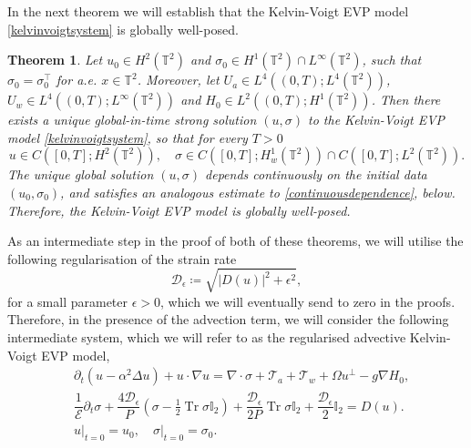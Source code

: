 \documentclass[12pt,a4paper]{article}
\newtheorem{theorem}{Theorem}[section]
\theoremstyle{definition}
\theoremstyle{remark}
\numberwithin{equation}{section}
\DeclareMathOperator{\Tr}{Tr}
\begin{document}
In the next theorem we will establish that the Kelvin-Voigt EVP model \eqref{kelvinvoigtsystem} is globally well-posed.
\begin{theorem} \label{globalwellposednessthm}
Let $u_0 \in H^2 (\mathbb{T}^2)$ and $\sigma_0 \in H^1 (\mathbb{T}^2) \cap L^\infty (\mathbb{T}^2)$, such that $\sigma_0 = \sigma_0^\top$ for a.e. $x \in \mathbb{T}^2$.  Moreover, let $U_a \in L^4 ((0,T); L^4 (\mathbb{T}^2))$, $U_w \in L^4 ((0,T); L^\infty (\mathbb{T}^2))$ and $H_0 \in L^2 ((0,T); H^1 (\mathbb{T}^2))$. Then there exists a unique global-in-time strong solution $(u,\sigma)$ to the Kelvin-Voigt EVP model \eqref{kelvinvoigtsystem}, so that for every $T > 0$
\begin{equation}
u \in C([0,T];H^2 (\mathbb{T}^2)), \quad \sigma \in C([0,T]; H^1_w (\mathbb{T}^2)) \cap C([0,T]; L^2 (\mathbb{T}^2)).
\end{equation}
The unique global solution $(u,\sigma)$ depends continuously on the initial data $(u_0, \sigma_0)$, and satisfies an analogous estimate to \eqref{continuousdependence}, below. Therefore, the Kelvin-Voigt EVP model is globally well-posed.
\end{theorem}
As an intermediate step in the proof of both of these theorems, we will utilise the following regularisation of the strain rate
\begin{equation} \label{strainrateregularisation}
\mathcal{D}_\epsilon \coloneqq \sqrt{\lvert D(u) \rvert^2 + \epsilon^2},
\end{equation}
for a small parameter $\epsilon > 0$, which we will eventually send to zero in the proofs. Therefore, in the presence of the advection term, we will consider the following intermediate system, which we will refer to as the regularised advective Kelvin-Voigt EVP model,
\begin{subequations} \label{advectionsystemepsilon}
\begin{align}
&\partial_t (u - \alpha^2 \Delta u) + u \cdot \nabla u  = \nabla \cdot \sigma + \mathcal{T}_a + \mathcal{T}_w + \Omega u^\perp - g \nabla H_0, \label{advection1epsilon} \\
&\dfrac{1}{\mathcal E} \partial_t \sigma + \dfrac{4 \mathcal{D}_\epsilon}{P} (\sigma - \frac{1}{2} \Tr \sigma \mathbb I_2) + \dfrac{\mathcal{D}_\epsilon}{2P} \Tr \sigma \mathbb I_2 + \dfrac{\mathcal{D}_\epsilon}{2} \mathbb I_2  = D(u). \label{advection2epsilon}
\\
&u \lvert_{t = 0} = u_0, \quad \sigma \lvert_{t = 0} = \sigma_0. \label{advection3epsilon}
\end{align}
\end{subequations}
\end{document}
